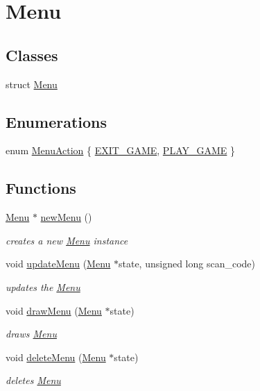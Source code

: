 \hypertarget{group__Menu}{}\section{Menu}
\label{group__Menu}
\subsection*{Classes}
\begin{DoxyCompactItemize}
\item 
struct \hyperlink{structMenu}{Menu}
\end{DoxyCompactItemize}
\subsection*{Enumerations}
\begin{DoxyCompactItemize}
\item 
enum \hyperlink{group__Menu_gab99074a1f6b7e8ff7730342913aae3a3}{Menu\+Action} \{ \hyperlink{group__Menu_ggab99074a1f6b7e8ff7730342913aae3a3a4bf4cbde18067e0600c7c8a7a30ba316}{E\+X\+I\+T\+\_\+\+G\+A\+ME}, 
\hyperlink{group__Menu_ggab99074a1f6b7e8ff7730342913aae3a3ac258a51e9cc26e302562d2bd792430b1}{P\+L\+A\+Y\+\_\+\+G\+A\+ME}
 \}
\end{DoxyCompactItemize}
\subsection*{Functions}
\begin{DoxyCompactItemize}
\item 
\hyperlink{structMenu}{Menu} $\ast$ \hyperlink{group__Menu_gab4c4331657aad73fe461b1946d6a80e6}{new\+Menu} ()
\begin{DoxyCompactList}\small\item\em creates a new \hyperlink{structMenu}{Menu} instance \end{DoxyCompactList}\item 
void \hyperlink{group__Menu_gab3392fb7e40877fd1ea754606fc9f8a1}{update\+Menu} (\hyperlink{structMenu}{Menu} $\ast$state, unsigned long scan\+\_\+code)
\begin{DoxyCompactList}\small\item\em updates the \hyperlink{structMenu}{Menu} \end{DoxyCompactList}\item 
void \hyperlink{group__Menu_gaf953dd83cbfca767233cb1c5f78eb266}{draw\+Menu} (\hyperlink{structMenu}{Menu} $\ast$state)
\begin{DoxyCompactList}\small\item\em draws \hyperlink{structMenu}{Menu} \end{DoxyCompactList}\item 
void \hyperlink{group__Menu_gaf155dd05949566ff9a0f29d8759bcd54}{delete\+Menu} (\hyperlink{structMenu}{Menu} $\ast$state)
\begin{DoxyCompactList}\small\item\em deletes \hyperlink{structMenu}{Menu} \end{DoxyCompactList}\end{DoxyCompactItemize}


